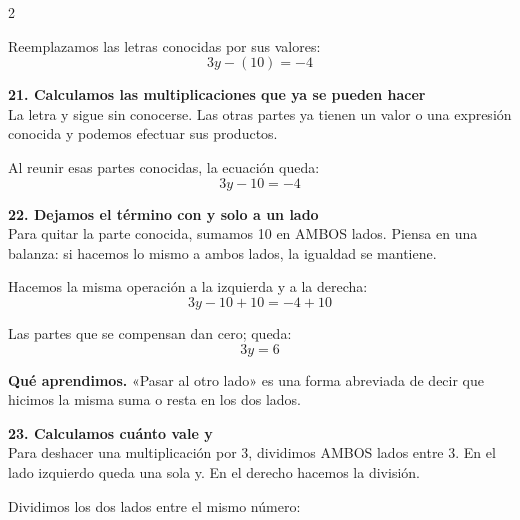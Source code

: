 \documentclass[11pt,a4paper,landscape]{article}
\begin{document}
\begin{multicols*}{2}
\begin{minipage}{\linewidth}
\par\smallskip Reemplazamos las letras conocidas por sus valores:
\[3y - \left(10\right)=-4\]
\end{minipage}\par\medskip
\noindent\begin{minipage}{\linewidth}\textbf{21. Calculamos las multiplicaciones que ya se pueden hacer}\\[2pt]La letra y sigue sin conocerse. Las otras partes ya tienen un valor o una expresión conocida y podemos efectuar sus productos.
\par{}\par\smallskip
\par\smallskip Al reunir esas partes conocidas, la ecuación queda:
\[3y - 10=-4\]
\end{minipage}\par\medskip
\noindent\begin{minipage}{\linewidth}\textbf{22. Dejamos el término con y solo a un lado}\\[2pt]Para quitar la parte conocida, sumamos 10 en AMBOS lados. Piensa en una balanza: si hacemos lo mismo a ambos lados, la igualdad se mantiene.
\par\smallskip Hacemos la misma operación a la izquierda y a la derecha:
\[3y - 10 + 10=-4 + 10\]
\par\smallskip Las partes que se compensan dan cero; queda:
\[3y=6\]
\par\smallskip\textbf{Qué aprendimos.} «Pasar al otro lado» es una forma abreviada de decir que hicimos la misma suma o resta en los dos lados.
\end{minipage}\par\medskip
\noindent\begin{minipage}{\linewidth}\textbf{23. Calculamos cuánto vale y}\\[2pt]Para deshacer una multiplicación por 3, dividimos AMBOS lados entre 3. En el lado izquierdo queda una sola y. En el derecho hacemos la división.
\par\smallskip Dividimos los dos lados entre el mismo número:

\end{minipage}
\end{multicols*}
\end{document}
